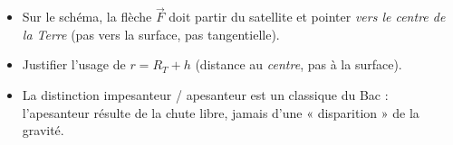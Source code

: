 \documentclass[11pt]{article}
\begin{document}
\begin{corrige}
\begin{attention}
\begin{itemize}
\item Sur le schéma, la flèche $\vec{F}$ doit partir du satellite et pointer \emph{vers le centre de la Terre} (pas vers la surface, pas tangentielle).
\item Justifier l'usage de $r = R_T + h$ (distance au \emph{centre}, pas à la surface).
\item La distinction impesanteur / apesanteur est un classique du Bac : l'apesanteur résulte de la chute libre, jamais d'une « disparition » de la gravité.
\end{itemize}
\end{attention}
\end{corrige}
\end{document}
